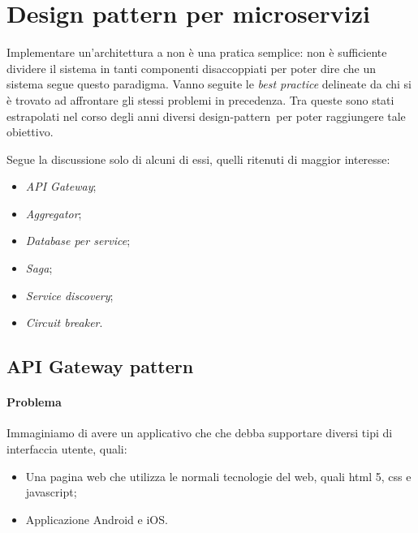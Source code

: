

\section{Design pattern per microservizi}

Implementare un'architettura a  non è una pratica semplice: non è sufficiente dividere il sistema in tanti componenti disaccoppiati per poter dire che un sistema segue questo paradigma.
Vanno seguite le \textit{best practice} delineate da chi si è trovato ad affrontare gli stessi problemi in precedenza.
Tra queste sono stati estrapolati nel corso degli anni diversi \gls{design-pattern}\gloss\ per poter raggiungere tale obiettivo.

Segue la discussione solo di alcuni di essi, quelli ritenuti di maggior interesse:

\begin{itemize}
	\item \textit{API Gateway};
	\item \textit{Aggregator};

	\item \textit{Database per service};
	\item \textit{Saga};

	\item \textit{Service discovery};
	\item \textit{Circuit breaker}.
\end{itemize}


\subsection{API Gateway pattern}\label{api-gateway}

\paragraph*{Problema} Immaginiamo di avere un applicativo che  che debba supportare diversi tipi di interfaccia utente, quali: 
\begin{itemize}[noitemsep]
	\item Una pagina web che utilizza le normali tecnologie del web, quali \acrshort{html} 5, \acrshort{css} e \gls{javascript};
	\item Applicazione Android e iOS.
\end{itemize}

